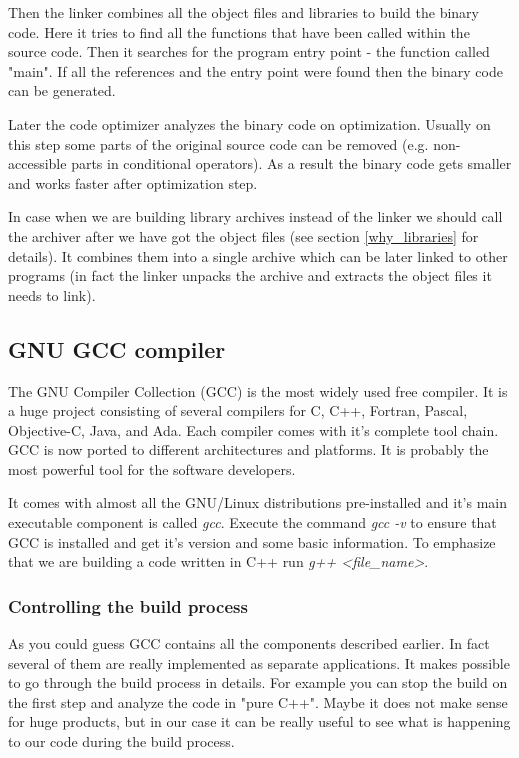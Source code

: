 Then the linker combines all the object files and libraries to build the binary code. Here it tries to find all the functions that have been called within the source code. Then it searches for the program entry point - the function called "main". If all the references and the entry point were found then the binary code can be generated.

Later the code optimizer analyzes the binary code on optimization. Usually on this step some parts of the original source code can be removed (e.g. non-accessible parts in conditional operators). As a result the binary code gets smaller and works faster after optimization step.

In case when we are building library archives instead of the linker we should call the archiver after we have got the object files (see section \ref{why_libraries} for details). It combines them into a single archive which can be later linked to other programs (in fact the linker unpacks the archive and extracts the object files it needs to link).

\subsection{GNU GCC compiler}
The GNU Compiler Collection (GCC) is the most widely used free compiler. It is a huge project consisting of several compilers for C, C++, Fortran, Pascal, Objective-C, Java, and Ada. Each compiler comes with it's complete tool chain. GCC is now ported to different architectures and platforms. It is probably the most powerful tool for the software developers.

It comes with almost all the GNU/Linux distributions pre-installed and it's main executable component is called \textit {gcc}. Execute the command \textit { gcc -v} to ensure that GCC is installed and get it's version and some basic information. To emphasize that we are building a code written in C++ run \textit { g++ <file\_name>}.

\subsubsection{Controlling the build process}
As you could guess GCC contains all the components described earlier. In fact several of them are really implemented as separate applications. It makes possible to go through the build process in details. For example you can stop the build on the first step and analyze the code in "pure C++". Maybe it does not make sense for huge products, but in our case it can be really useful to see what is happening to our code during the build process.

